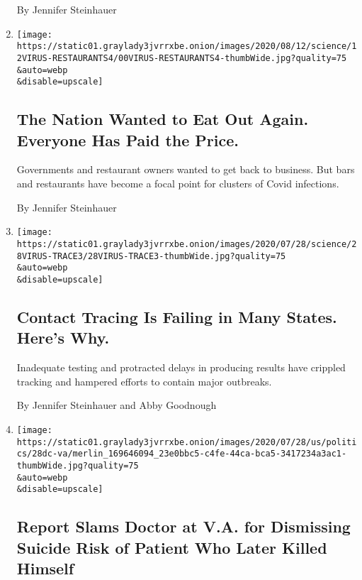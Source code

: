 \begin{enumerate}
  By Jennifer Steinhauer
\item
  \href{/2020/08/12/health/Covid-restaurants-bars.html}{}

  \texttt{[image: https://static01.graylady3jvrrxbe.onion/images/2020/08/12/science/12VIRUS-RESTAURANTS4/00VIRUS-RESTAURANTS4-thumbWide.jpg?quality=75\\\&auto=webp\\\&disable=upscale]}

  \hypertarget{the-nation-wanted-to-eat-out-again-everyone-has-paid-the-price}{%
  \subsection{The Nation Wanted to Eat Out Again. Everyone Has Paid the
  Price.}\label{the-nation-wanted-to-eat-out-again-everyone-has-paid-the-price}}

  Governments and restaurant owners wanted to get back to business. But
  bars and restaurants have become a focal point for clusters of Covid
  infections.

  By Jennifer Steinhauer
\item
  \href{/2020/07/31/health/covid-contact-tracing-tests.html}{}

  \texttt{[image: https://static01.graylady3jvrrxbe.onion/images/2020/07/28/science/28VIRUS-TRACE3/28VIRUS-TRACE3-thumbWide.jpg?quality=75\\\&auto=webp\\\&disable=upscale]}

  \hypertarget{contact-tracing-is-failing-in-many-states-heres-why}{%
  \subsection{Contact Tracing Is Failing in Many States. Here's
  Why.}\label{contact-tracing-is-failing-in-many-states-heres-why}}

  Inadequate testing and protracted delays in producing results have
  crippled tracking and hampered efforts to contain major outbreaks.

  By Jennifer Steinhauer and Abby Goodnough
\item
  \href{/2020/07/28/us/politics/veterans-suicide.html}{}

  \texttt{[image: https://static01.graylady3jvrrxbe.onion/images/2020/07/28/us/politics/28dc-va/merlin\_169646094\_23e0bbc5-c4fe-44ca-bca5-3417234a3ac1-thumbWide.jpg?quality=75\\\&auto=webp\\\&disable=upscale]}

  \hypertarget{report-slams-doctor-at-va-for-dismissing-suicide-risk-of-patient-who-later-killed-himself}{%
  \subsection{Report Slams Doctor at V.A. for Dismissing Suicide Risk of
  Patient Who Later Killed
  Himself}\label{report-slams-doctor-at-va-for-dismissing-suicide-risk-of-patient-who-later-killed-himself}}


\end{enumerate}
